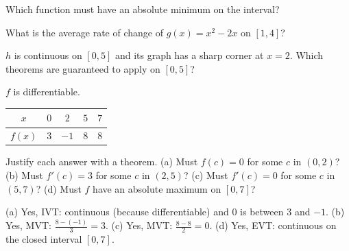 \begin{exo}{}
Which function must have an absolute minimum on the interval?
\choices{$\frac1x$ on $[1,3]$}{$\frac1x$ on $(0,3]$}{$x$ on $(0,1)$}{$\frac{1}{x-2}$ on $[1,3]$}
\end{exo}
\begin{exo}{}
What is the average rate of change of $g(x)=x^2-2x$ on $[1,4]$?
\end{exo}
\begin{exo}{}
$h$ is continuous on $[0,5]$ and its graph has a sharp corner at $x=2$. Which theorems are guaranteed to apply on $[0,5]$?
\end{exo}
\begin{exo}{}
$f$ is differentiable. \;\begin{tabular}{|c|c|c|c|c|}\hline$x$&$0$&$2$&$5$&$7$\\\hline$f(x)$&$3$&$-1$&$8$&$8$\\\hline\end{tabular}\; Justify each answer with a theorem. (a) Must $f(c)=0$ for some $c$ in $(0,2)$? (b) Must $f'(c)=3$ for some $c$ in $(2,5)$? (c) Must $f'(c)=0$ for some $c$ in $(5,7)$? (d) Must $f$ have an absolute maximum on $[0,7]$?
\work{3.5cm}
\begin{solution}
(a) Yes, IVT: continuous (because differentiable) and $0$ is between $3$ and $-1$. (b) Yes, MVT: $\frac{8-(-1)}{3}=3$. (c) Yes, MVT: $\frac{8-8}{2}=0$. (d) Yes, EVT: continuous on the closed interval $[0,7]$.
\end{solution}
\end{exo}

